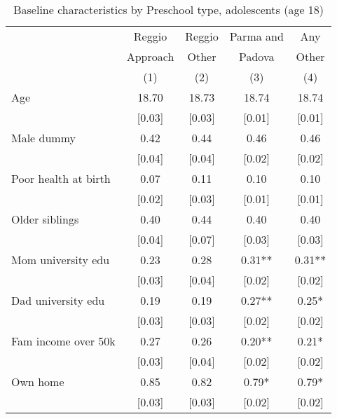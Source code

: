 \begin{table}[H]
\caption{Baseline characteristics by Preschool type, adolescents (age 18)}
\label{tab:adol_CONTROLmaterna}
\centering
\begin{adjustbox}{max height=\dimexpr\textheight-5.5cm\relax,max width=\textwidth}
\small
\begin{tabular}{l cccc}
\hline \hline 
 & Reggio & Reggio & Parma and & Any \\
 & Approach & Other & Padova & Other \\
 &   (1)    &  (2)  & (3)    &  (4) \\
\hline 

Age   &   18.70   &   18.73   &   18.74   &   18.74 \\ 
   &   [0.03]   &   [0.03]   &   [0.01]   &   [0.01] \\ 
Male dummy   &   0.42   &   0.44   &   0.46   &   0.46 \\ 
   &   [0.04]   &   [0.04]   &   [0.02]   &   [0.02] \\ 
Poor health at birth   &   0.07   &   0.11   &   0.10   &   0.10 \\ 
   &   [0.02]   &   [0.03]   &   [0.01]   &   [0.01] \\ 
Older siblings   &   0.40   &   0.44   &   0.40   &   0.40 \\ 
   &   [0.04]   &   [0.07]   &   [0.03]   &   [0.03] \\ 
Mom university edu   &   0.23   &   0.28   &   0.31**   &   0.31** \\ 
   &   [0.03]   &   [0.04]   &   [0.02]   &   [0.02] \\ 
Dad university edu   &   0.19   &   0.19   &   0.27**   &   0.25* \\ 
   &   [0.03]   &   [0.03]   &   [0.02]   &   [0.02] \\ 
Fam income over 50k   &   0.27   &   0.26   &   0.20**   &   0.21* \\ 
   &   [0.03]   &   [0.04]   &   [0.02]   &   [0.02] \\ 
Own home   &   0.85   &   0.82   &   0.79*   &   0.79* \\ 
   &   [0.03]   &   [0.03]   &   [0.02]   &   [0.02] \\ 

\end{tabular}
\end{adjustbox}
\end{table}
